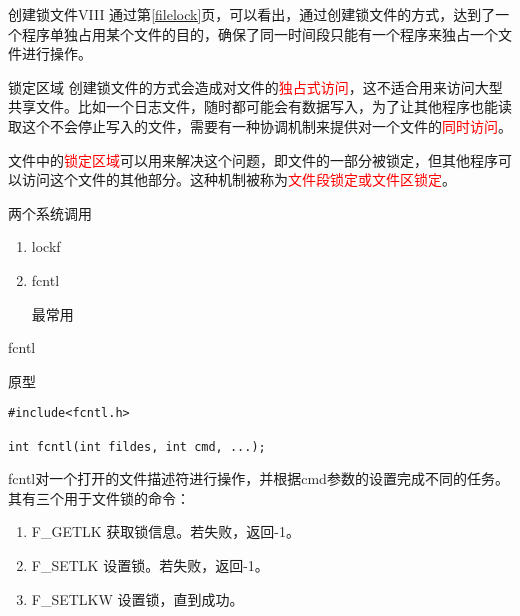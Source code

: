 \documentclass{beamer}
\begin{document}
\begin{frame}[fragile]{创建锁文件VIII}
通过第\ref{filelock}页，可以看出，通过创建锁文件的方式，达到了一个程序单独占用某个文件的目的，确保了同一时间段只能有一个程序来独占一个文件进行操作。
\end{frame}
\begin{frame}{锁定区域}
创建锁文件的方式会造成对文件的\textcolor{red}{独占式访问}，这不适合用来访问大型共享文件。比如一个日志文件，随时都可能会有数据写入，为了让其他程序也能读取这个不会停止写入的文件，需要有一种协调机制来提供对一个文件的\textcolor{red}{同时访问}。

文件中的\textcolor{red}{锁定区域}可以用来解决这个问题，即文件的一部分被锁定，但其他程序可以访问这个文件的其他部分。这种机制被称为\textcolor{red}{文件段锁定或文件区锁定}。

\begin{block}{两个系统调用}
\begin{enumerate}
\item
lockf
\item
fcntl

最常用
\end{enumerate}
\end{block}
\end{frame}
\begin{frame}[fragile]{fcntl}
\begin{block}{原型}
\begin{lstlisting}
#include<fcntl.h>

int fcntl(int fildes, int cmd, ...);
\end{lstlisting}
\end{block}
fcntl对一个打开的文件描述符进行操作，并根据cmd参数的设置完成不同的任务。其有三个用于文件锁的命令：
\begin{enumerate}
\label{flckcmd}
\item
F\_GETLK  获取锁信息。若失败，返回-1。
\item
F\_SETLK 设置锁。若失败，返回-1。
\item
F\_SETLKW 设置锁，直到成功。
\end{enumerate}
\end{frame}
\end{document}
